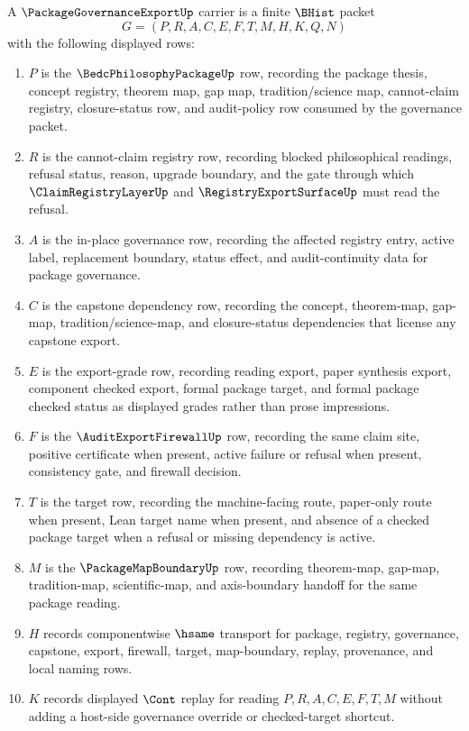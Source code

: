 \begin{definition}
\label{def:package-governance-export-carrier}
A $\PackageGovernanceExportUp$ carrier is a finite $\BHist$ packet
$$
G=(P,R,A,C,E,F,T,M,H,K,Q,N)
$$
with the following displayed rows:
\begin{enumerate}
\item $P$ is the $\BedcPhilosophyPackageUp$ row, recording the package thesis, concept registry, theorem map, gap map, tradition/science map, cannot-claim registry, closure-status row, and audit-policy row consumed by the governance packet.
\item $R$ is the cannot-claim registry row, recording blocked philosophical readings, refusal status, reason, upgrade boundary, and the gate through which $\ClaimRegistryLayerUp$ and $\RegistryExportSurfaceUp$ must read the refusal.
\item $A$ is the in-place governance row, recording the affected registry entry, active label, replacement boundary, status effect, and audit-continuity data for package governance.
\item $C$ is the capstone dependency row, recording the concept, theorem-map, gap-map, tradition/science-map, and closure-status dependencies that license any capstone export.
\item $E$ is the export-grade row, recording reading export, paper synthesis export, component checked export, formal package target, and formal package checked status as displayed grades rather than prose impressions.
\item $F$ is the $\AuditExportFirewallUp$ row, recording the same claim site, positive certificate when present, active failure or refusal when present, consistency gate, and firewall decision.
\item $T$ is the target row, recording the machine-facing route, paper-only route when present, Lean target name when present, and absence of a checked package target when a refusal or missing dependency is active.
\item $M$ is the $\PackageMapBoundaryUp$ row, recording theorem-map, gap-map, tradition-map, scientific-map, and axis-boundary handoff for the same package reading.
\item $H$ records componentwise $\hsame$ transport for package, registry, governance, capstone, export, firewall, target, map-boundary, replay, provenance, and local naming rows.
\item $K$ records displayed $\Cont$ replay for reading $P,R,A,C,E,F,T,M$ without adding a host-side governance override or checked-target shortcut.

\end{enumerate}
\end{definition}
